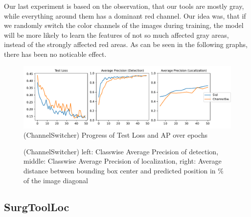 Our last experiment is based on the observation, that our tools are mostly gray, while everything around them has a dominant red channel. Our idea was, that if we randomly switch the color channels of the images during training, the model will be more likely to learn the features of not so much affected gray areas, instead of the strongly affected red areas. As can be seen in the following graphs, there has been no noticable effect.

\begin{figure}[h]
	\centering
	\includegraphics[width=15cm]{4_experiments/images/2_cs_exp/APs.pdf}
	\caption{(ChannelSwitcher) Progress of Test Loss and AP over epochs}
	\label{fig:cs_aps}
\end{figure}

\begin{figure}[h]
	\centering
	\caption{(ChannelSwitcher) left: Classwise Average Precision of detection, middle: Classwise Average Precision of localization, right: Average distance between bounding box center and predicted position in \% of the image diagonal}
	\label{fig:cd_distances}
\end{figure}


\FloatBarrier
\subsection{SurgToolLoc}


